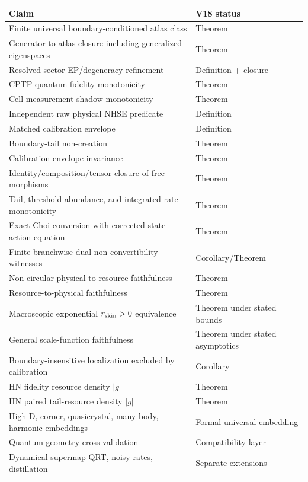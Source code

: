 \documentclass[11pt]{article}
\begin{document}
\begin{center}
\small
\begin{tabular}{@{}p{}p{}@{}}
\toprule
Claim & V18 status\\
\midrule
Finite universal boundary-conditioned atlas class & Theorem\\
Generator-to-atlas closure including generalized eigenspaces & Theorem\\
Resolved-sector EP/degeneracy refinement & Definition + closure\\
CPTP quantum fidelity monotonicity & Theorem\\
Cell-measurement shadow monotonicity & Theorem\\
Independent raw physical NHSE predicate & Definition\\
Matched calibration envelope & Definition\\
Boundary-tail non-creation & Theorem\\
Calibration envelope invariance & Theorem\\
Identity/composition/tensor closure of free morphisms & Theorem\\
Tail, threshold-abundance, and integrated-rate monotonicity & Theorem\\
Exact Choi conversion with corrected state-action equation & Theorem\\
Finite branchwise dual non-convertibility witnesses & Corollary/Theorem\\
Non-circular physical-to-resource faithfulness & Theorem\\
Resource-to-physical faithfulness & Theorem\\
Macroscopic exponential \(r_{\rm skin}>0\) equivalence & Theorem under stated bounds\\
General scale-function faithfulness & Theorem under stated asymptotics\\
Boundary-insensitive localization excluded by calibration & Corollary\\
HN fidelity resource density \(|g|\) & Theorem\\
HN paired tail-resource density \(|g|\) & Theorem\\
High-D, corner, quasicrystal, many-body, harmonic embeddings & Formal universal embedding\\
Quantum-geometry cross-validation & Compatibility layer\\
Dynamical supermap QRT, noisy rates, distillation & Separate extensions\\
\bottomrule
\end{tabular}
\end{center}
\end{document}
